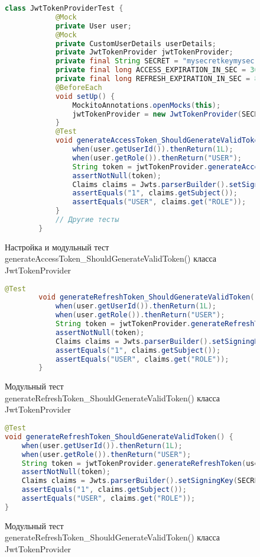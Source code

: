 \begin{figure}[!ht]
	\begin{lstlisting}[language=Java]
		class JwtTokenProviderTest {
			@Mock
			private User user;
			@Mock
			private CustomUserDetails userDetails;
			private JwtTokenProvider jwtTokenProvider;
			private final String SECRET = "mysecretkeymysecretkeymysecretkeymysecretkey";
			private final long ACCESS_EXPIRATION_IN_SEC = 3600;
			private final long REFRESH_EXPIRATION_IN_SEC = 86400;
			@BeforeEach
			void setUp() {
				MockitoAnnotations.openMocks(this);
				jwtTokenProvider = new JwtTokenProvider(SECRET, ACCESS_EXPIRATION_IN_SEC, REFRESH_EXPIRATION_IN_SEC);
			}
			@Test
			void generateAccessToken_ShouldGenerateValidToken() {
				when(user.getUserId()).thenReturn(1L);
				when(user.getRole()).thenReturn("USER");
				String token = jwtTokenProvider.generateAccessToken(user);
				assertNotNull(token);
				Claims claims = Jwts.parserBuilder().setSigningKey(SECRET).build().parseClaimsJws(token).getBody();
				assertEquals("1", claims.getSubject());
				assertEquals("USER", claims.get("ROLE"));
			}
			// Другие тесты	
		}
	\end{lstlisting}  
	\caption{Настройка и модульный тест generateAccessToken\_ShouldGenerateValidToken() класса JwtTokenProvider}
	\label{unitJwt:image}
\end{figure}
\begin{figure}[!ht]
	\begin{lstlisting}[language=Java]
		@Test
		void generateRefreshToken_ShouldGenerateValidToken() {
			when(user.getUserId()).thenReturn(1L);
			when(user.getRole()).thenReturn("USER");
			String token = jwtTokenProvider.generateRefreshToken(user);
			assertNotNull(token);
			Claims claims = Jwts.parserBuilder().setSigningKey(SECRET).build().parseClaimsJws(token).getBody();
			assertEquals("1", claims.getSubject());
			assertEquals("USER", claims.get("ROLE"));
		}
	\end{lstlisting}  
	\caption{Модульный тест generateRefreshToken\_ShouldGenerateValidToken() класса JwtTokenProvider}
	\label{unitJwtRef:image}
\end{figure}
\begin{figure}[!ht]
	\begin{lstlisting}[language=Java]
@Test
void generateRefreshToken_ShouldGenerateValidToken() {
	when(user.getUserId()).thenReturn(1L);
	when(user.getRole()).thenReturn("USER");
	String token = jwtTokenProvider.generateRefreshToken(user);
	assertNotNull(token);
	Claims claims = Jwts.parserBuilder().setSigningKey(SECRET).build().parseClaimsJws(token).getBody();
	assertEquals("1", claims.getSubject());
	assertEquals("USER", claims.get("ROLE"));
}
	\end{lstlisting}  
	\caption{Модульный тест generateRefreshToken\_ShouldGenerateValidToken() класса JwtTokenProvider}
	\label{unitJwtRef:image}
\end{figure}
